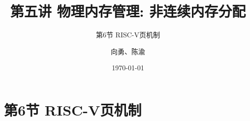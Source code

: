 


\title[第5讲]{第五讲 物理内存管理: 非连续内存分配} %
\subtitle{第6节 RISC-V页机制}
\author{向勇、陈渝} %
\date{\today} %



\begin{frame}
\titlepage %
\end{frame}


\section{第6节 RISC-V页机制}%


